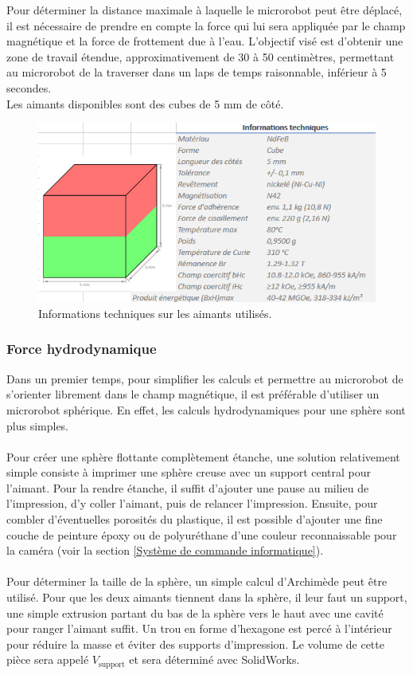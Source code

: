 \documentclass{article}
\begin{document}
Pour déterminer la distance maximale à laquelle le microrobot peut être déplacé, il est nécessaire de prendre en compte la force qui lui sera appliquée par le champ magnétique et la force de frottement due à l'eau. L'objectif visé est d'obtenir une zone de travail étendue, approximativement de 30 à 50 centimètres, permettant au microrobot de la traverser dans un laps de temps raisonnable, inférieur à 5 secondes.
\\
 Les aimants disponibles sont des cubes de 5 mm de côté.
\begin{figure}[H]
    \centering
    \includegraphics[width=0.5\linewidth]{Images/info_aimant.png}
    \caption{Informations techniques sur les aimants utilisés.}
    \label{fig:info_aimants}
\end{figure}
\subsubsection{Force hydrodynamique}
Dans un premier temps, pour simplifier les calculs et permettre au microrobot de s'orienter librement dans le champ magnétique, il est préférable d'utiliser un microrobot sphérique. En effet, les calculs hydrodynamiques pour une sphère sont plus simples.
\\
\\
Pour créer une sphère flottante complètement étanche, une solution relativement simple consiste à imprimer une sphère creuse avec un support central pour l'aimant. Pour la rendre étanche, il suffit d'ajouter une pause au milieu de l'impression, d'y coller l'aimant, puis de relancer l'impression. Ensuite, pour combler d'éventuelles porosités du plastique, il est possible d'ajouter une fine couche de peinture époxy ou de polyuréthane d'une couleur reconnaissable pour la caméra (voir la section \ref{Système de commande informatique}). 
\\
\\
Pour déterminer la taille de la sphère, un simple calcul d'Archimède peut être utilisé.
Pour que les deux aimants tiennent dans la sphère, il leur faut un support, une simple extrusion partant du bas de la sphère vers le haut avec une cavité pour ranger l'aimant suffit. Un trou en forme d'hexagone est percé à l'intérieur pour réduire la masse et éviter des supports d'impression. Le volume de cette pièce sera appelé $V_{\text{support}}$ et sera déterminé avec SolidWorks.
\end{document}
